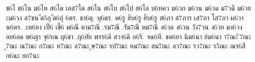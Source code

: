 {ช6ไ
ธ6ไน
ม6ไห
ส6ไต
เลส7ไต
ส6ไน
ส6ไบ
ส6ไป
ส6ไล
บ6ทคว
ม6วก
ม6วน
ม6วด
ม7วดี
ม6วย
ะม6วง
ล7ชน
ัต5ถุ
ัต6ถุ์
6ตร.
ธา6ตุ.
บุ6ตร.
ค6รู
ฮิบ6รู
ฮีบ6รู
ส6ภา
ส7ภาร
เส7ภา
โส7ภา
ผ6วา
น6คร.
.เห6ยง
เปี่6
เขี้6
ม6ณี
คาม7ณี
.รม7ณี
.รัม7ณี
หม7ณี
ง6วด
ง6วน
วัง7วน
ง6วย
มง6วง
อย6อด
พ6ญา
จุ6รณ
ฤ6ชา
.ฤ6ทัย
พรร6ดิ
สวา6ดิ
อ6ริ.
จน6ที.
ธค6ยา
นิม6นา
ย์ม6นา
า7ณะ
ิ7ณะ
ุ7ณะ
ณ7ณะ
ก7ณะ
ท7ณะ
ล7ณะ
ุษ7ณะ
รป7ณะ
หม7ณะ
สม7ณะ
ลว7ณะ
รว7ณะ
ร5ณะ
ณร6สี
ก6นะ
ยก7นะ
}

